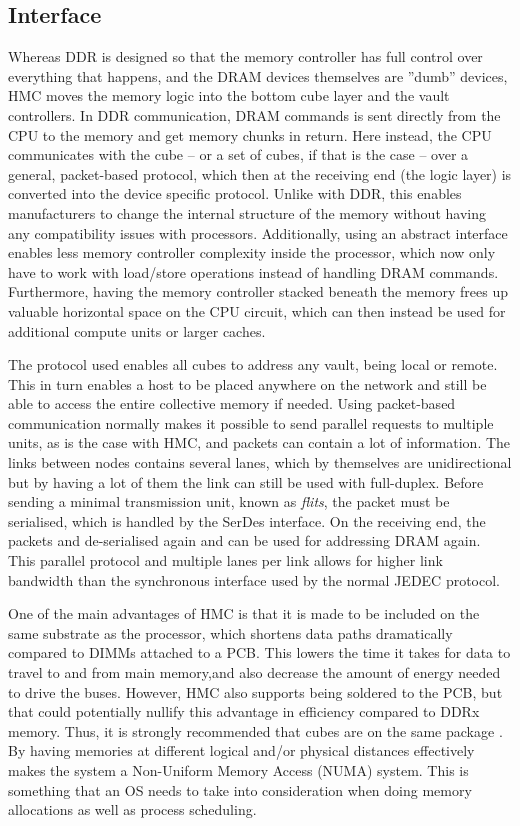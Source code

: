 \subsection{Interface}
Whereas DDR is designed so that the memory controller has full control over everything that happens, and the DRAM devices themselves are ''dumb'' devices, HMC moves the memory logic into the bottom cube layer and the vault controllers. In DDR communication, DRAM commands is sent directly from the CPU to the memory and get memory chunks in return. Here instead, the CPU communicates with the cube -- or a set of cubes, if that is the case -- over a general, packet-based protocol, which then at the receiving end (the logic layer) is converted into the device specific protocol. Unlike with DDR, this enables manufacturers to change the internal structure of the memory without having any compatibility issues with processors. Additionally, using an abstract interface enables less memory controller complexity inside the processor, which now only have to work with load/store operations instead of handling DRAM commands. Furthermore, having the memory controller stacked beneath the memory frees up valuable horizontal space on the CPU circuit, which can then instead be used for additional compute units or larger caches.  
\bigskip

The protocol used enables all cubes to address any vault, being local or remote. This in turn enables a host to be placed anywhere on the network and still be able to access the entire collective memory if needed. Using packet-based communication normally makes it possible to send parallel requests to multiple units, as is the case with HMC, and packets can contain a lot of information. The links between nodes contains several lanes, which by themselves are unidirectional but by having a lot of them the link can still be used with full-duplex. Before sending a minimal transmission unit, known as \emph{flits}, the packet must be serialised, which is handled by the SerDes interface. On the receiving end, the packets and de-serialised again and can be used for addressing DRAM again. This parallel protocol and multiple lanes per link allows for higher link bandwidth than the synchronous interface used by the normal JEDEC protocol. 
\bigskip

One of the main advantages of HMC is that it is made to be included on the same substrate as the processor, which shortens data paths dramatically compared to DIMMs attached to a PCB. This lowers the time it takes for data to travel to and from main memory,and also decrease the amount of energy needed to drive the buses. However, HMC also supports being soldered to the PCB, but that could potentially nullify this advantage in efficiency compared to DDRx memory. Thus, it is strongly recommended that cubes are on the same package \cite{hybrid2013hybrid}. By having memories at different logical and/or physical distances effectively makes the system a Non-Uniform Memory Access (NUMA) system. This is something that an OS needs to take into consideration when doing memory allocations as well as process scheduling. 
\bigskip


